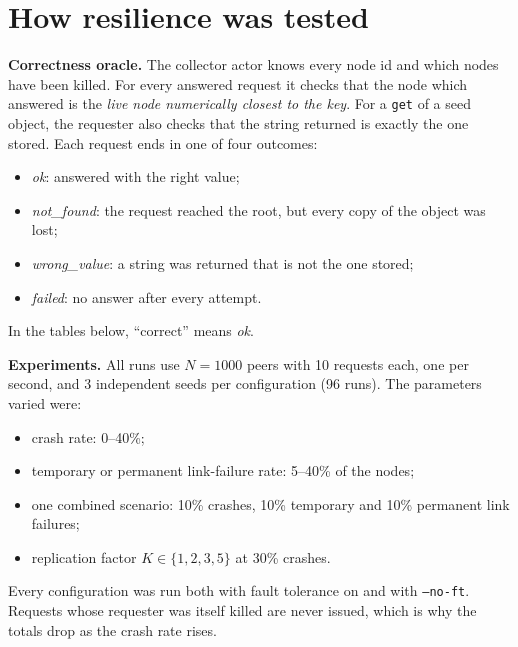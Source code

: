\documentclass[10pt]{article}
\begin{document}
\section{How resilience was tested}
\textbf{Correctness oracle.} The collector actor knows every node id and which nodes have been killed.
For every answered request it checks that the node which answered is the \emph{live node numerically closest to the key}.
For a \texttt{get} of a seed object, the requester also checks that the string returned is exactly the one stored.
Each request ends in one of four outcomes:
\begin{itemize}
  \item \emph{ok}: answered with the right value;
  \item \emph{not\_found}: the request reached the root, but every copy of the object was lost;
  \item \emph{wrong\_value}: a string was returned that is not the one stored;
  \item \emph{failed}: no answer after every attempt.
\end{itemize}
In the tables below, ``correct'' means \emph{ok}.

\textbf{Experiments.} All runs use $N=1000$ peers with 10 requests each, one per second, and 3 independent seeds per configuration (96 runs).
The parameters varied were:
\begin{itemize}
  \item crash rate: 0--40\%;
  \item temporary or permanent link-failure rate: 5--40\% of the nodes;
  \item one combined scenario: 10\% crashes, 10\% temporary and 10\% permanent link failures;
  \item replication factor $K \in \{1,2,3,5\}$ at 30\% crashes.
\end{itemize}
Every configuration was run both with fault tolerance on and with \texttt{--no-ft}.
Requests whose requester was itself killed are never issued, which is why the totals drop as the crash rate rises.
\end{document}

